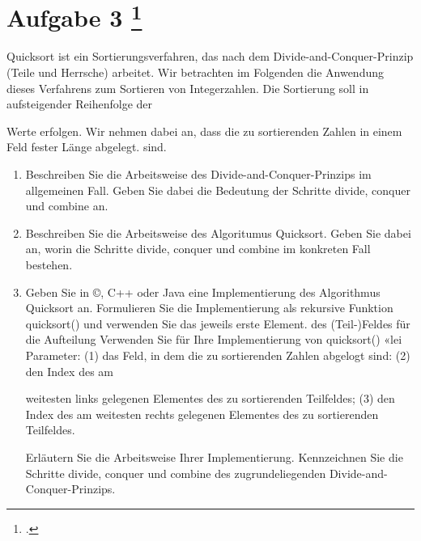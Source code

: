 \documentclass{lehramt-informatik-aufgabe}
\begin{document}
\liAufgabenTitel{}
\section{Aufgabe 3
\footcite{46114:2008:09}}

Quicksort ist ein Sortierungsverfahren, das nach dem
Divide-and-Conquer-Prinzip (Teile und Herrsche) arbeitet. Wir betrachten
im Folgenden die Anwendung dieses Verfahrens zum Sortieren von
Integerzahlen. Die Sortierung soll in aufsteigender Reihenfolge der

Werte erfolgen. Wir nehmen dabei an, dass die zu sortierenden Zahlen in
einem Feld fester Länge abgelegt. sind.
\begin{enumerate}


\item Beschreiben Sie die Arbeitsweise des Divide-and-Conquer-Prinzips
im allgemeinen Fall. Geben Sie dabei die Bedeutung der Schritte divide,
conquer und combine an.


\item Beschreiben Sie die Arbeitsweise des Algoritumus Quicksort. Geben
Sie dabei an, worin die Schritte divide, conquer und combine im
konkreten Fall bestehen.


\item Geben Sie in ©, C++ oder Java eine Implementierung des Algorithmus
Quicksort an. Formulieren Sie die Implementierung als rekursive Funktion
quicksort() und verwenden Sie das jeweils erste Element. des
(Teil-)Feldes für die Aufteilung Verwenden Sie für Ihre Implementierung
von quicksort() «lei Parameter: (1) das Feld, in dem die zu sortierenden
Zahlen abgelogt sind: (2) den Index des am

weitesten links gelegenen Elementes des zu sortierenden Teilfeldes; (3)
den Index des am weitesten rechts gelegenen Elementes des zu
sortierenden Teilfeldes.

Erläutern Sie die Arbeitsweise Ihrer Implementierung. Kennzeichnen Sie
die Schritte divide, conquer und combine des zugrundeliegenden
Divide-and-Conquer-Prinzips.
\end{enumerate}
\end{document}
